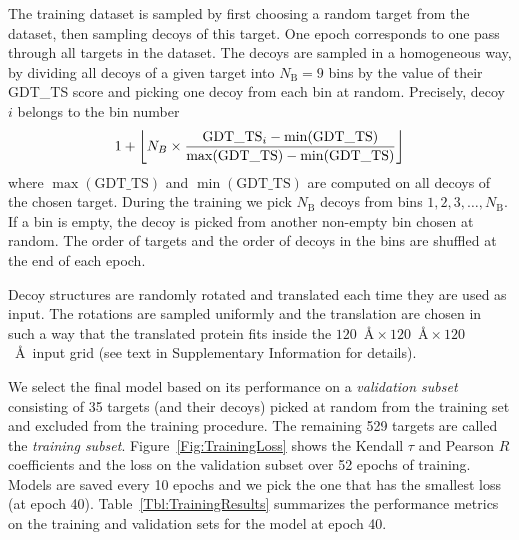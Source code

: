 \documentclass{bioinfo}
\DeclarePairedDelimiter\floor{\lfloor}{\rfloor}
\begin{document}
The training dataset is sampled by first choosing a random target from
the dataset, then sampling decoys of this target. One epoch
corresponds to one pass through all targets in the dataset. The decoys
are sampled in a homogeneous way, by dividing all decoys of a given
target into $N_\text{B} = 9$ bins by the value of their GDT\_TS score
and picking one decoy from each bin at random.
Precisely, decoy $i$ belongs to the bin number 
\begin{equation}
1 + \floor*{ N_B \times \frac{\text{GDT\_TS}_i - \min(\text{GDT\_TS}) }{\max(\text{GDT\_TS}) - \min(\text{GDT\_TS})} }
\end{equation}
where $\max(\text{GDT\_TS})$ and $\min(\text{GDT\_TS})$ are computed
on all decoys of the chosen target.  During the training we pick
$N_\text{B}$ decoys from bins $1, 2, 3, \ldots, N_\text{B}$.  If a bin
is empty, the decoy is picked from another non-empty bin chosen at
random.  The order of targets and the order of decoys in the bins are
shuffled at the end of each epoch.

Decoy structures are randomly rotated and translated each time they
are used as input. The rotations are sampled uniformly
\citep{shoemake1992uniform} and the translation are chosen in such a
way that the translated protein fits inside the $120$~\AA${}\times
120$~\AA${}\times 120$~\AA\ input grid (see text in Supplementary
Information for details).

We select the final model based on its performance on a
\emph{validation subset} consisting of 35 targets (and their decoys)
picked at random from the training set and excluded from the training
procedure. The remaining 529 targets are called the \emph{training
subset}.  Figure~\ref{Fig:TrainingLoss} shows the Kendall $\tau$ and
Pearson $R$ coefficients and the loss on the validation subset over 52
epochs of training.  Models are saved every 10 epochs and we pick the
one that has the smallest loss (at epoch 40).
Table~\ref{Tbl:TrainingResults} summarizes the performance metrics on
the training and validation sets for the model at epoch 40.
%
%
\end{document}
